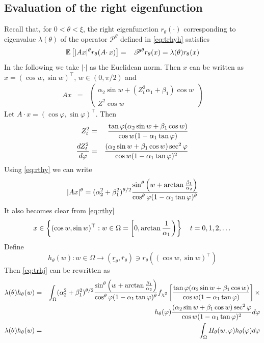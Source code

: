 \subsection{Evaluation of the right eigenfunction}
\label{sec:eigenfunction}
Recall that, for $0 < \theta < \xi$, the right eigenfunction
$r_\theta(\cdot)$ corresponding to eigenvalue $\lambda(\theta)$ of the
operator $\mathscr P^\theta$ defined in \eqref{eq:trhyh} satisfies
\begin{eqnarray}
  \label{eq:trhj}
  \mathbb{E} \left[
    |A x|^\theta r_\theta(A \cdotp x)
    \right]
  &=&
  \mathscr P^\theta r_\theta(x) = \lambda(\theta) r_\theta(x)
\end{eqnarray}
In the following we take $|\cdot|$ as the Euclidean norm. Then $x$
can be written as $x = (\cos w, \sin w)^\top$, $w \in (0, \pi/2)$ and
\begin{eqnarray*}
  A x &=&
  \begin{pmatrix}
    \alpha_2 \sin w + (Z_t^2 \alpha_1 + \beta_1) \cos w \\
    Z^2 \cos w
  \end{pmatrix}
\end{eqnarray*}
Let $A \cdot x = (\cos \varphi, \sin\varphi)^\top$. Then
\begin{eqnarray}
  Z_t^2 &=&
  {\tan\varphi (\alpha_2 \sin w + \beta_1 \cos w)
    \over
    \cos w (1- \alpha_1 \tan\varphi)
  } \label{eq:rthy} \\
  {d Z_{t}^2 \over d\varphi}
  &=&
  {
    (\alpha_2 \sin w + \beta_1 \cos w) \sec^2\varphi
    \over
    \cos w (1 - \alpha_1 \tan\varphi)^2
  } \nonumber
\end{eqnarray}
Using \eqref{eq:rthy} we can write
\[
|A x|^{\theta}
=
(\alpha_2^2 + \beta_1^2)^{\theta/2}
{
  \sin^\theta\left(
  w + \arctan{\beta_1 \over \alpha_2}
  \right)
  \over
  \cos^\theta\varphi (1 - \alpha_1 \tan\varphi)^\theta
}
\]
It also becomes clear from \eqref{eq:rthy}
\[
x \in \left\{(\cos w, \sin w)^\top:
w \in \Omega = \left[0, \arctan{1 \over \alpha_1}\right)
\right\}
\quad
t = 0,1,2,\dots
\]
Define
\[
h_\theta(w): w \in \Omega \to (\underline r_\theta, \bar r_\theta)
\ni r_\theta((\cos w, \sin w)^\top)
\]
Then \eqref{eq:trhj} can be rewritten as
\begin{eqnarray}
  \lambda(\theta) h_\theta(w)
  &=&
\int_\Omega (\alpha_2^2 + \beta_1^2)^{\theta/2} {
  \sin^\theta\left(
  w + \arctan{\beta_1 \over \alpha_2}
  \right)
  \over
  \cos^\theta\varphi (1 - \alpha_1 \tan\varphi)^\theta
}
f_{\chi^2}\left[
{\tan\varphi (\alpha_2 \sin w + \beta_1 \cos w)
  \over
  \cos w (1- \alpha_1 \tan\varphi)
} \right] \times \nonumber\\
&&
h_\theta(\varphi)
{
  (\alpha_2 \sin w + \beta_1 \cos w) \sec^2\varphi
  \over
  \cos w (1 - \alpha_1 \tan\varphi)^2
}
d\varphi \nonumber \\
\lambda(\theta) h_\theta(w)
&=&
\int_\Omega H_\theta(w, \varphi) h_\theta(\varphi) d\varphi
\end{eqnarray}
